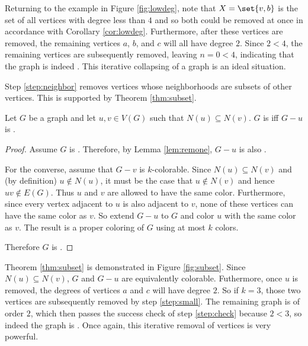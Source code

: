 Returning to the example in Figure \ref{fig:lowdeg}, note that \(X=\set{v,b}\) is the set of all vertices with
degree less than \(4\) and so both could be removed at once in accordance with Corollary \ref{cor:lowdeg}.
Furthermore, after these vertices are removed, the remaining vertices \(a\), \(b\), and \(c\) will all have degree
\(2\).  Since \(2<4\), the remaining vertices are subsequently removed, leaving \(n=0<4\), indicating that the
graph is indeed .  This iterative collapsing of a graph is an ideal situation.

Step \ref{step:neighbor} removes vertices whose neighborhoods are subsets of other vertices.  This is supported by
Theorem \ref{thm:subset}.

\begin{theorem}
  \label{thm:subset}
  Let \(G\) be a graph and let \(u,v\in V(G)\) such that \(N(u)\subseteq N(v)\).  \(G\) is  iff \(G-u\)
  is .
\end{theorem}

\begin{proof}
  Assume \(G\) is .  Therefore, by Lemma \ref{lem:remone}, \(G-u\) is also .

  For the converse, assume that \(G-v\) is \(k\)-colorable.  Since \(N(u)\subseteq N(v)\) and (by definition)
  \(u\notin N(u)\), it must be the case that \(u\notin N(v)\) and hence \(uv\notin E(G)\).  Thus \(u\) and \(v\)
  are allowed to have the same color.  Furthermore, since every vertex adjacent to \(u\) is also adjacent to \(v\),
  none of these vertices can have the same color as \(v\).  So extend \(G-u\) to \(G\) and color \(u\) with the
  same color as \(v\).  The result is a proper coloring of \(G\) using at most \(k\) colors.

  Therefore \(G\) is .
\end{proof}

Theorem \ref{thm:subset} is demonstrated in Figure \ref{fig:subset}.  Since \(N(u)\subseteq N(v)\), \(G\) and
\(G-u\) are equivalently colorable.  Futhermore, once \(u\) is removed, the degrees of vertices \(a\) and \(c\)
will have degree \(2\).  So if \(k=3\), those two vertices are subsequently removed by step \ref{step:small}.  The
remaining graph is of order \(2\), which then passes the success check of step \ref{step:check} because \(2<3\), so
indeed the graph is .  Once again, this iterative removal of vertices is very powerful.

